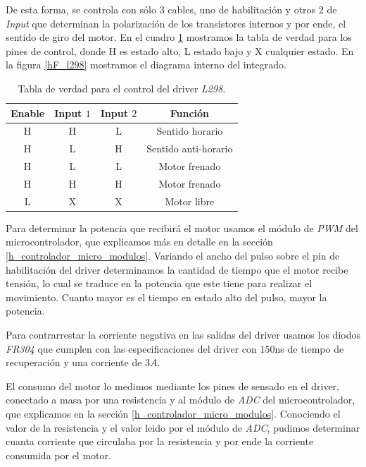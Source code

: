 De esta forma, se controla con s\'olo $3$ cables, uno de habilitaci\'on y otros $2$ de \emph{Input} que determinan
la polarizaci\'on de los transistores internos y por ende, el sentido de giro del motor.
En el cuadro \ref{hT_l298} mostramos la tabla de verdad para los pines de control, donde H es estado alto, L estado bajo y X cualquier estado.
En la figura \ref{hF_l298} mostramos el diagrama interno del integrado.

\begin{table}
	\begin{center}
		\begin{tabular}{|c|c|c|c|}
			\hline
			Enable & Input $1$ & Input $2$ & Funci\'on \\
			\hline
			H & H & L & Sentido horario \\
			H & L & H & Sentido anti-horario \\
			H & L & L & Motor frenado \\
			H & H & H & Motor frenado \\
			L & X & X & Motor libre \\
			\hline
		\end{tabular}
	\end{center}
	\caption{Tabla de verdad para el control del driver \emph{L298}.}
	\label{hT_l298}
\end{table}

Para determinar la potencia que recibir\'a el motor usamos el m\'odulo de \emph{PWM} del microcontrolador, que explicamos m\'as en detalle en la
secci\'on \ref{h_controlador_micro_modulos}.
Variando el ancho del pulso sobre el pin de habilitaci\'on del driver determinamos la cantidad de tiempo que el motor recibe tensi\'on, lo cual
se traduce en la potencia que este tiene para realizar el movimiento.
Cuanto mayor es el tiempo en estado alto del pulso, mayor la potencia.

Para contrarrestar la corriente negativa en las salidas del driver usamos los diodos \emph{FR304} que cumplen con las especificaciones del driver
con $150$ns de tiempo de recuperaci\'on y una corriente de $3 A$.

El consumo del motor lo medimos mediante los pines de sensado en el driver, conectado a masa por una resistencia y al m\'odulo de \emph{ADC} del
microcontrolador, que explicamos en la secci\'on \ref{h_controlador_micro_modulos}.
Conociendo el valor de la resistencia y el valor leido por el m\'odulo de \emph{ADC}, pudimos determinar cuanta corriente que circulaba por la
resistencia y por ende la corriente consumida por el motor.

